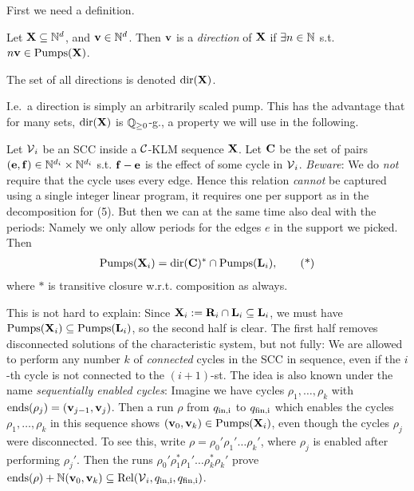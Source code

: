 First we need a definition.

\begin{definition}
Let \(\mathbf{X} \subseteq \mathbb{N}^d\), and \(\mathbf{v} \in \mathbb{N}^d\). Then \(\mathbf{v}\) is a \emph{direction} of \(\mathbf{X}\) if \(\exists n \in \mathbb{N}\) s.t. \(n \mathbf{v} \in \operatorname{Pumps}(\mathbf{X})\).

The set of all directions is denoted \(\operatorname{dir}(\mathbf{X})\).
\end{definition}

I.e.\ a direction is simply an arbitrarily scaled pump. This has the advantage that for many sets, \(\operatorname{dir}(\mathbf{X})\) is \(\mathbb{Q}_{\geq 0}\)-g., a property we will use in the following.

Let \(\operatorname{\mathcal{V}}_i\) be an SCC inside a \(\mathcal{C}\)-KLM sequence \(\mathbf{X}\). Let \(\mathbf{C}\) be the set of pairs \((\mathbf{e}, \mathbf{f})\in \mathbb{N}^{d_i} \times \mathbb{N}^{d_i}\) s.t. \(\mathbf{f}-\mathbf{e}\) is the effect of some cycle in \(\operatorname{\mathcal{V}}_i\). \emph{Beware}: We do \emph{not} require that the cycle uses every edge. Hence this relation \emph{cannot} be captured using a single integer linear program, it requires one per support as in the decomposition for (5). But then we can at the same time also deal with the periods: Namely we only allow periods for the edges \(e\) in the support we picked. Then 
\begin{align}
\operatorname{Pumps}(\mathbf{X}_i)=\operatorname{dir}(\mathbf{C})^{\ast} \cap \operatorname{Pumps}(\mathbf{L}_i), \tag{*} \label{EquationPumpsFormula}
\end{align}
where \(\ast\) is transitive closure w.r.t. composition as always.

This is not hard to explain: Since \(\mathbf{X}_i:=\mathbf{R}_i \cap \mathbf{L}_i \subseteq \mathbf{L}_i\), we must have \(\operatorname{Pumps}(\mathbf{X}_i) \subseteq \operatorname{Pumps}(\mathbf{L}_i)\), so the second half is clear. The first half removes disconnected solutions of the characteristic system, but not fully: We are allowed to perform any number \(k\) of \emph{connected} cycles in the SCC in sequence, even if the \(i\)-th cycle is not connected to the \((i+1)\)-st. The idea is also known under the name \emph{sequentially enabled cycles}: Imagine we have cycles \(\rho_1, \dots, \rho_k\) with \(\operatorname{ends}(\rho_j)=(\mathbf{v}_{j-1}, \mathbf{v}_j)\). Then a run \(\rho\) from \(q_{\text{in,i}}\) to \(q_{\text{fin,i}}\) which enables the cycles \(\rho_1, \dots, \rho_k\) in this sequence shows \((\mathbf{v}_0, \mathbf{v}_k) \in \operatorname{Pumps}(\mathbf{X}_i)\), even though the cycles \(\rho_j\) were disconnected. To see this, write \(\rho=\rho_0' \rho_1' \dots \rho_k'\), where \(\rho_j\) is enabled after performing \(\rho_j'\). Then the runs \(\rho_0' \rho_1^{\ast} \rho_1' \dots \rho_k^{\ast} \rho_k'\) prove \(\operatorname{ends}(\rho)+\mathbb{N}(\mathbf{v}_0, \mathbf{v}_k)\subseteq \operatorname{Rel}(\operatorname{\mathcal{V}}_i, q_{\text{in,i}}, q_{\text{fin,i}})\).

